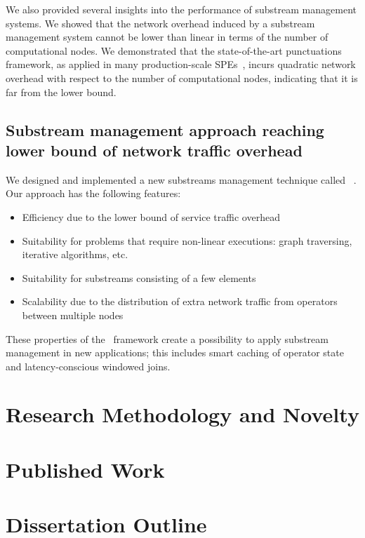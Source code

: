 We also provided several insights into the performance of substream management systems. We showed that the network overhead induced by a substream management system cannot be lower than linear in terms of the number of computational nodes. We demonstrated that the state-of-the-art punctuations framework, as applied in many production-scale SPEs~\cite{tucker2003exploiting}, incurs quadratic network overhead with respect to the number of computational nodes, indicating that it is far from the lower bound.

\subsection{Substream management approach reaching lower bound of network traffic overhead}

We designed and implemented a new substreams management technique called \tracker~\cite{10.1145/3524860.3539809, trofimov2023bounding}. Our approach has the following features:

\begin{itemize}
    \item Efficiency due to the lower bound of service traffic overhead
    \item Suitability for problems that require non-linear executions: graph traversing, iterative algorithms, etc.
    \item Suitability for substreams consisting of a few elements
    \item Scalability due to the distribution of extra network traffic from operators between multiple nodes
\end{itemize}

These properties of the \tracker\ framework create a possibility to apply substream management in new applications; this includes smart caching of operator state and latency-conscious windowed joins.

\section{Research Methodology and Novelty}

\section{Published Work}

\section{Dissertation Outline}
